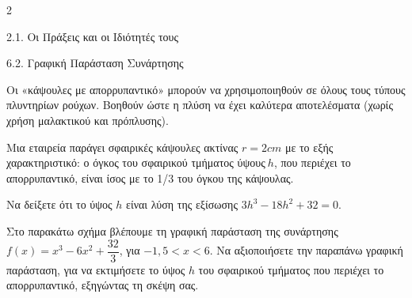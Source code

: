\begin{ylh}{2}
    \item 2.1. Οι Πράξεις και οι Ιδιότητές τους
    \item 6.2. Γραφική Παράσταση Συνάρτησης
\end{ylh}
{
Οι «κάψουλες με απορρυπαντικό» μπορούν να χρησιμοποιηθούν σε όλους τους τύπους πλυντηρίων ρούχων. Βοηθούν ώστε η πλύση να έχει καλύτερα αποτελέσματα (χωρίς χρήση μαλακτικού και πρόπλυσης).

\begin{alist}
\item Μια εταιρεία παράγει σφαιρικές κάψουλες ακτίνας $r = 2cm$ με το εξής χαρακτηριστικό: ο όγκος του σφαιρικού τμήματος ύψους$\ h$, που περιέχει το απορρυπαντικό, είναι ίσος με το 1/3 του όγκου της κάψουλας.

\begin{rlist}
\item Να δείξετε ότι το ύψος $h$ είναι λύση της εξίσωσης ${3h}^{3} - 18h^{2} + 32 = 0$.
\item Στο παρακάτω σχήμα βλέπουμε τη γραφική παράσταση της συνάρτησης $f(x) = x^{3} - 6x^{2} + \dfrac{32}{3}$, για $- 1{,}5 < x < 6$.
Να αξιοποιήσετε την παραπάνω γραφική παράσταση, για να εκτιμήσετε το ύψος $h$ του σφαιρικού τμήματος που περιέχει το απορρυπαντικό, εξηγώντας τη σκέψη σας.
\end{rlist}
\end{alist}}



